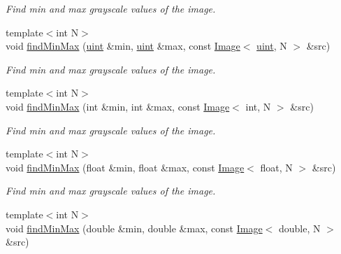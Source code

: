 \begin{DoxyCompactItemize}
\begin{DoxyCompactList}\small\item\em Find min and max grayscale values of the image. \end{DoxyCompactList}\item 
\hypertarget{group___image_ga5fdba220239c83db39192d5663c9590d}{{\footnotesize template$<$int N$>$ }\\void \hyperlink{group___image_ga5fdba220239c83db39192d5663c9590d}{find\-Min\-Max} (\hyperlink{group___eigen_typedefs_ga91ad9478d81a7aaf2593e8d9c3d06a14}{uint} \&min, \hyperlink{group___eigen_typedefs_ga91ad9478d81a7aaf2593e8d9c3d06a14}{uint} \&max, const \hyperlink{class_d_o_1_1_image}{Image}$<$ \hyperlink{group___eigen_typedefs_ga91ad9478d81a7aaf2593e8d9c3d06a14}{uint}, N $>$ \&src)}\label{group___image_ga5fdba220239c83db39192d5663c9590d}

\begin{DoxyCompactList}\small\item\em Find min and max grayscale values of the image. \end{DoxyCompactList}\item 
\hypertarget{group___image_gae75301dfe4245689d6552204da1bac7c}{{\footnotesize template$<$int N$>$ }\\void \hyperlink{group___image_gae75301dfe4245689d6552204da1bac7c}{find\-Min\-Max} (int \&min, int \&max, const \hyperlink{class_d_o_1_1_image}{Image}$<$ int, N $>$ \&src)}\label{group___image_gae75301dfe4245689d6552204da1bac7c}

\begin{DoxyCompactList}\small\item\em Find min and max grayscale values of the image. \end{DoxyCompactList}\item 
\hypertarget{group___image_ga0573e8647b615d0698ef000b5f013766}{{\footnotesize template$<$int N$>$ }\\void \hyperlink{group___image_ga0573e8647b615d0698ef000b5f013766}{find\-Min\-Max} (float \&min, float \&max, const \hyperlink{class_d_o_1_1_image}{Image}$<$ float, N $>$ \&src)}\label{group___image_ga0573e8647b615d0698ef000b5f013766}

\begin{DoxyCompactList}\small\item\em Find min and max grayscale values of the image. \end{DoxyCompactList}\item 
\hypertarget{group___image_ga7b3472d8bf6ea05fb0c39ba0e380a924}{{\footnotesize template$<$int N$>$ }\\void \hyperlink{group___image_ga7b3472d8bf6ea05fb0c39ba0e380a924}{find\-Min\-Max} (double \&min, double \&max, const \hyperlink{class_d_o_1_1_image}{Image}$<$ double, N $>$ \&src)}\label{group___image_ga7b3472d8bf6ea05fb0c39ba0e380a924}


\end{DoxyCompactItemize}
